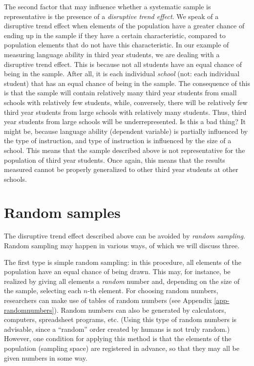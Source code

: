 \documentclass[
]{book}
\begin{document}
The second factor that may influence whether a systematic sample is representative is the presence of a \emph{disruptive trend effect}. We speak of a disruptive trend effect when elements of the population have a greater chance of ending up in the sample if they have a certain characteristic, compared to population elements that do not have this characteristic. In our example of measuring language ability in third year students, we are dealing with a disruptive trend effect. This is because not all students have an equal chance of being in the sample. After all, it is each individual \emph{school} (not: each individual student) that has an equal chance of being in the sample. The consequence of this is that the sample will contain relatively many third year students from small schools with relatively few students, while, conversely, there will be relatively few third year students from large schools with relatively many students. Thus, third year students from large schools will be underrepresented. Is this a bad thing? It might be, because language ability (dependent variable) is partially influenced by the type of instruction, and type of instruction is influenced by the size of a school. This means that the sample described above is not representative for the population of third year students. Once again, this means that the results measured cannot be properly generalized to other third year students at other schools.

\section{Random samples}\label{sec:random-samples}

The disruptive trend effect described above can be avoided by \emph{random sampling}. Random sampling may happen in various ways, of which we will discuss three.

The first type is simple random sampling: in this procedure, all elements of the population have an equal chance of being drawn. This may, for instance, be realized by giving all elements a \emph{random} number and, depending on the size of the sample, selecting each \(n\)-th element. For choosing random numbers, researchers can make use of tables of random numbers (see Appendix \ref{app-randomnumbers}). Random numbers can also be generated by calculators, computers, spreadsheet programs, etc. (Using this type of random numbers is advisable, since a ``random'' order created by humans is not truly random.) However, one condition for applying this method is that the elements of the population (sampling space) are registered in advance, so that they may all be given numbers in some way.
\end{document}
